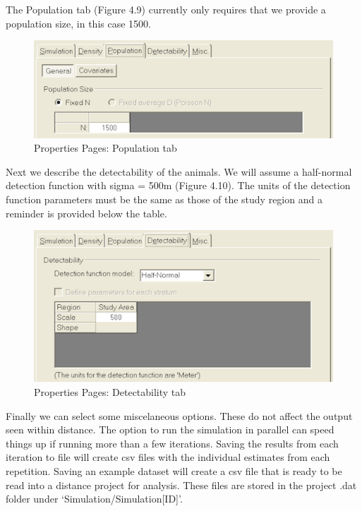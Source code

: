 \documentclass[]{book}
\theoremstyle{definition}
\theoremstyle{definition}
\theoremstyle{remark}
\begin{document}
\newpage

The Population tab (Figure 4.9) currently only requires that we provide
a population size, in this case 1500.

\begin{figure}
\centering
\includegraphics{images/population.png}
\caption{Properties Pages: Population tab}
\end{figure}

Next we describe the detectability of the animals. We will assume a
half-normal detection function with sigma = 500m (Figure 4.10). The
units of the detection function parameters must be the same as those of
the study region and a reminder is provided below the table.

\begin{figure}
\centering
\includegraphics{images/detect.png}
\caption{Properties Pages: Detectability tab}
\end{figure}

Finally we can select some miscelaneous options. These do not affect the
output seen within distance. The option to run the simulation in
parallel can speed things up if running more than a few iterations.
Saving the results from each iteration to file will create csv files
with the individual estimates from each repetition. Saving an example
dataset will create a csv file that is ready to be read into a distance
project for analysis. These files are stored in the project .dat folder
under `Simulation/Simulation{[}ID{]}'.
\end{document}
